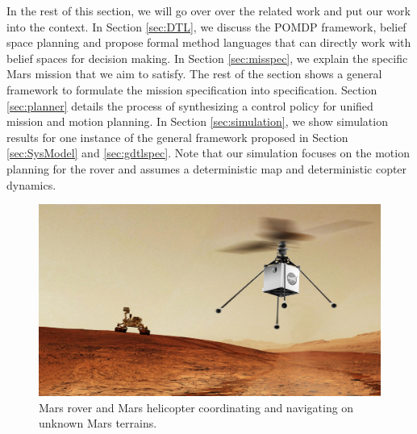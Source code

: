 \documentclass[conference]{IEEEtran}
\begin{document}
	In the rest of this section, we will go over over the related work and put our work into the context. 
	In Section \ref{sec:DTL}, we discuss the POMDP framework, belief space planning and propose formal method languages that can directly work with belief spaces for decision making. In Section \ref{sec:misspec}, we explain the specific Mars mission that we aim to satisfy. The rest of the section shows a general framework to formulate the mission specification into \DTL specification.
	Section \ref{sec:planner} details the process of synthesizing a control policy for unified mission and motion planning.
	In Section \ref{sec:simulation}, we show simulation results for one instance of the general framework proposed in Section \ref{sec:SysModel} and \ref{sec:gdtlspec}. Note that our simulation focuses on the motion planning for the rover and assumes a deterministic map and deterministic copter dynamics. 
	\begin{figure}[t]
		\centering
		\includegraphics[width=0.99\columnwidth]{figs/heli-rover.png}
		\caption{Mars rover and Mars helicopter coordinating and navigating on unknown Mars terrains.}
		\label{fig:cover}
	\end{figure}
	
\end{document}
